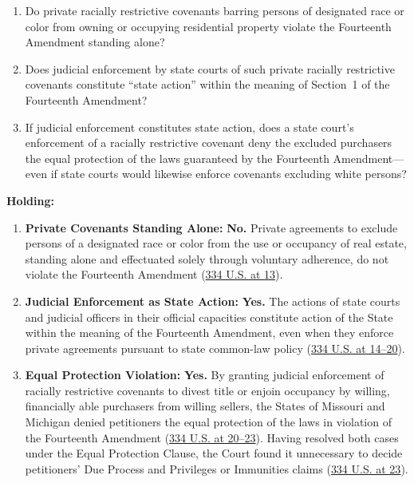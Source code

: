 \documentclass[12pt]{article}
\begin{document}
\begin{enumerate}
    \item Do private racially restrictive covenants barring persons of designated race or color from owning or occupying residential property violate the Fourteenth Amendment standing alone?
    \item Does judicial enforcement by state courts of such private racially restrictive covenants constitute ``state action'' within the meaning of Section~1 of the Fourteenth Amendment?
    \item If judicial enforcement constitutes state action, does a state court's enforcement of a racially restrictive covenant deny the excluded purchasers the equal protection of the laws guaranteed by the Fourteenth Amendment---even if state courts would likewise enforce covenants excluding white persons?
\end{enumerate}

\textbf{Holding:}

\begin{enumerate}
    \item \textbf{Private Covenants Standing Alone:} \textbf{No.} Private agreements to exclude persons of a designated race or color from the use or occupancy of real estate, standing alone and effectuated solely through voluntary adherence, do not violate the Fourteenth Amendment (\href{https://supreme.justia.com/cases/federal/us/334/1/}{334 U.S. at 13}).
    \item \textbf{Judicial Enforcement as State Action:} \textbf{Yes.} The actions of state courts and judicial officers in their official capacities constitute action of the State within the meaning of the Fourteenth Amendment, even when they enforce private agreements pursuant to state common-law policy (\href{https://supreme.justia.com/cases/federal/us/334/1/}{334 U.S. at 14--20}).
    \item \textbf{Equal Protection Violation:} \textbf{Yes.} By granting judicial enforcement of racially restrictive covenants to divest title or enjoin occupancy by willing, financially able purchasers from willing sellers, the States of Missouri and Michigan denied petitioners the equal protection of the laws in violation of the Fourteenth Amendment (\href{https://supreme.justia.com/cases/federal/us/334/1/}{334 U.S. at 20--23}). Having resolved both cases under the Equal Protection Clause, the Court found it unnecessary to decide petitioners' Due Process and Privileges or Immunities claims (\href{https://supreme.justia.com/cases/federal/us/334/1/}{334 U.S. at 23}).
\end{enumerate}
\end{document}
